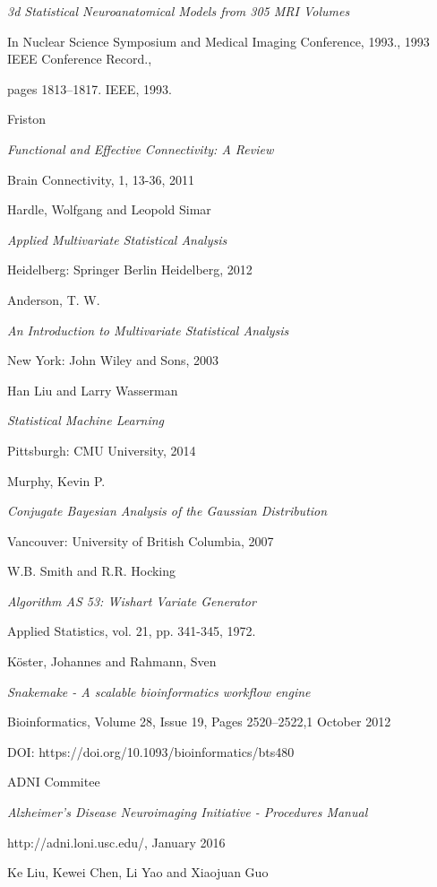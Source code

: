 \documentclass[12pt,openright,twoside,a4paper]{book}
\begin{document}
\begin{thebibliography}{99}
\emph{3d Statistical Neuroanatomical Models from 305 MRI Volumes}

In Nuclear Science Symposium and Medical Imaging Conference, 1993., 1993 IEEE Conference Record.,

pages 1813–1817. IEEE, 1993.

Friston

\emph{Functional and Effective Connectivity: A Review}

 Brain Connectivity, 1, 13-36, 2011

Hardle, Wolfgang and Leopold Simar

\emph{Applied Multivariate Statistical Analysis}

Heidelberg: Springer Berlin Heidelberg, 2012

Anderson, T. W.

\emph{An Introduction to Multivariate Statistical Analysis}
 
New York: John Wiley and Sons,  2003

 Han Liu and Larry Wasserman
 
 \emph{Statistical Machine Learning}

 Pittsburgh: CMU University, 2014
 
Murphy, Kevin P.

\emph{Conjugate Bayesian Analysis of the Gaussian Distribution}

Vancouver: University of British Columbia, 2007
 
W.B. Smith and R.R. Hocking

\emph{Algorithm AS 53: Wishart Variate Generator}

Applied Statistics, vol. 21, pp. 341-345, 1972.

Köster, Johannes and Rahmann, Sven

\emph{Snakemake - A scalable bioinformatics workflow engine}

Bioinformatics, Volume 28, Issue 19, Pages 2520–2522,1 October 2012

DOI: https://doi.org/10.1093/bioinformatics/bts480

ADNI Commitee

\emph{Alzheimer's Disease Neuroimaging Initiative - Procedures Manual}

http://adni.loni.usc.edu/, January 2016


Ke Liu, Kewei Chen, Li Yao and Xiaojuan Guo


\end{thebibliography}
\end{document}
